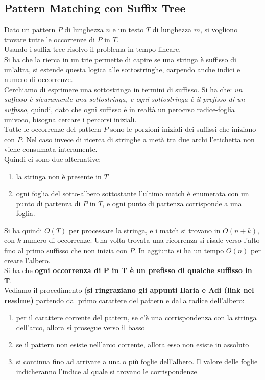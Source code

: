 \documentclass[a4paper,12pt, oneside]{book}
\begin{document}
\subsection{Pattern Matching con Suffix Tree}
Dato un pattern $P$ di lunghezza $n$ e un testo $T$ di lunghezza $m$,
si vogliono trovare tutte le occorrenze di $P$ in $T$.\\
Usando i suffix tree risolvo il problema in tempo lineare.\\
Si ha che la rierca in un trie permette di capire se una stringa è
suffisso di un'altra, si estende questa logica alle sottostringhe,
carpendo anche indici e numero di occorrenze. \\
Cerchiamo di esprimere una sottostringa in termini di suffisso. Si ha
che: \textit{un suffisso è sicuramente una sottostringa, e ogni
  sottostringa è il prefisso di un suffisso}, quindi, dato che ogni suffisso è
in realtà un perocrso radice-foglia univoco, bisogna cercare i
percorsi iniziali. \\
Tutte le occorrenze del pattern $P$ sono le porzioni iniziali dei
suffissi che iniziano con $P$. Nel caso invece di ricerca di stringhe
a metà tra due archi l’etichetta non viene consumata interamente.\\
Quindi ci sono due alternative:
\begin{enumerate}
  \item la stringa non è presente in $T$
  \item ogni foglia del sotto-albero sottostante l’ultimo match è
  enumerata con un punto di partenza di $P$ in $T$, e ogni punto di
  partenza corrisponde a una foglia. 
\end{enumerate}
Si ha quindi $O(T)$ per processare la stringa, e i match si trovano in
$O(n+k)$, con $k$ numero di occorrenze. Una volta trovata una
ricorrenza si risale verso l'alto fino al primo suffisso che non
inizia con $P$. In aggiunta si ha un tempo $O(n)$ per creare l'albero.\\
Si ha che \textbf{ogni occorrenza di P in T è un prefisso di qualche
  suffisso in T}.\\
Vediamo il procedimento (\textbf{si ringraziano gli appunti Ilaria e
  Adi (link nel readme)} partendo dal primo carattere del pattern e dalla radice dell’albero:
\begin{enumerate}
  \item per il carattere corrente del pattern, se c’è una
  corrispondenza con la stringa dell’arco, allora 
  si prosegue verso il basso
  \item se il pattern non esiste nell’arco corrente, allora esso non
  esiste in assoluto
  \item si continua fino ad arrivare a una o più foglie
  dell’albero. Il valore delle foglie indicheranno 
  l’indice al quale si trovano le corrispondenze 
\end{enumerate}
\end{document}
